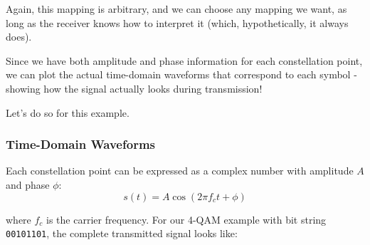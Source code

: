 Again, this mapping is arbitrary, and we can choose any mapping we want, as long as the receiver knows how to interpret it (which, hypothetically, it always does).

Since we have both amplitude and phase information for each constellation point, we can plot the actual time-domain waveforms that correspond to each symbol - showing how the signal actually looks during transmission!

Let's do so for this example.

\subsubsection{Time-Domain Waveforms}
Each constellation point can be expressed as a complex number with amplitude $A$ and phase $\phi$:
$$s(t) = A \cos(2\pi f_c t + \phi)$$

where $f_c$ is the carrier frequency. For our 4-QAM example with bit string \texttt{00101101}, the complete transmitted signal looks like:

